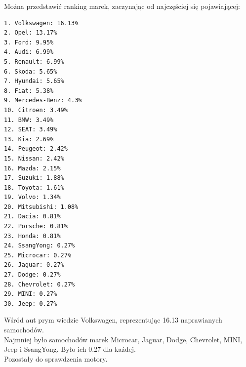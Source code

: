 \documentclass{article}\usepackage[]{graphicx}\usepackage[]{xcolor}
\begin{document}
Można przedstawić ranking marek, zaczynając od najczęściej się pojawiającej:

\begin{verbatim}
1. Volkswagen: 16.13%
2. Opel: 13.17%
3. Ford: 9.95%
4. Audi: 6.99%
5. Renault: 6.99%
6. Skoda: 5.65%
7. Hyundai: 5.65%
8. Fiat: 5.38%
9. Mercedes-Benz: 4.3%
10. Citroen: 3.49%
11. BMW: 3.49%
12. SEAT: 3.49%
13. Kia: 2.69%
14. Peugeot: 2.42%
15. Nissan: 2.42%
16. Mazda: 2.15%
17. Suzuki: 1.88%
18. Toyota: 1.61%
19. Volvo: 1.34%
20. Mitsubishi: 1.08%
21. Dacia: 0.81%
22. Porsche: 0.81%
23. Honda: 0.81%
24. SsangYong: 0.27%
25. Microcar: 0.27%
26. Jaguar: 0.27%
27. Dodge: 0.27%
28. Chevrolet: 0.27%
29. MINI: 0.27%
30. Jeep: 0.27%
\end{verbatim}

Wśród aut prym wiedzie Volkswagen, reprezentując  16.13 naprawianych samochodów. \\

Najmniej było samochodów marek Microcar, Jaguar, Dodge, Chevrolet, MINI, Jeep i SsangYong. Było ich 0.27 dla każdej. \\

Pozostały do sprawdzenia motory.
\end{document}
